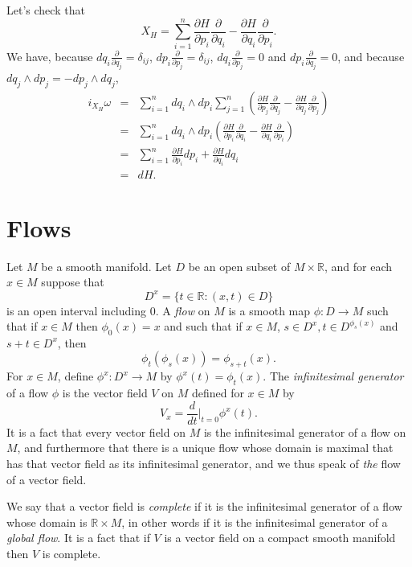 \documentclass{article}
\begin{document}
Let's check that 
\[
X_H = \sum_{i=1}^n \frac{\partial H}{\partial p_i} \frac{\partial}{\partial q_i}-\frac{\partial H}{\partial q_i}\frac{\partial}{\partial p_i}.
\]
We have, because $dq_i \frac{\partial}{\partial q_j}=\delta_{ij}$,  $dp_i \frac{\partial}{\partial p_j}=\delta_{ij}$, $dq_i \frac{\partial}{\partial p_j}=0$
and $dp_i \frac{\partial}{\partial q_j}=0$, and because $dq_j \wedge dp_j = - dp_j \wedge dq_j$,
\begin{eqnarray*}
i_{X_H} \omega&=&\sum_{i=1}^n dq_i \wedge dp_i  \sum_{j=1}^n \left( \frac{\partial H}{\partial p_j} \frac{\partial}{\partial q_j}-\frac{\partial H}{\partial q_j}\frac{\partial}{\partial p_j} \right)\\
&=&\sum_{i=1}^n dq_i \wedge dp_i \left(\frac{\partial H}{\partial p_i} \frac{\partial}{\partial q_i}-\frac{\partial H}{\partial q_i}\frac{\partial}{\partial p_i} \right)\\
&=&\sum_{i=1}^n \frac{\partial H}{\partial p_i} dp_i + \frac{\partial H}{\partial q_i} dq_i\\
&=&dH.
\end{eqnarray*}



\section{Flows}
Let $M$ be a smooth manifold. Let $D$ be an open subset of $M \times \mathbb{R}$, and for each $x \in M$ suppose that
\[
D^x = \{t \in \mathbb{R}: (x,t) \in D\}
\]
is an open interval including $0$. 
A {\em flow} on $M$ is a smooth map $\phi:D \to M$ such that if $x \in M$ then $\phi_0(x)=x$
and such that
if $x \in M$, $s \in D^x, t \in D^{\phi_s(x)}$ and $s+t \in D^x$, then
\[
\phi_t(\phi_s(x))=\phi_{s+t}(x).
\]
For $x \in M$, define $\phi^x:D^x \to M$ by $\phi^x(t)=\phi_t(x)$. 
The {\em infinitesimal generator} of a flow $\phi$ is the vector field $V$  on $M$ defined  for $x \in M$ by
\[
V_x=\frac{d}{dt}\Big|_{t=0} \phi^x(t).
\]
It is a fact that every vector field on $M$ is the infinitesimal generator of a flow on $M$, and furthermore that there is a unique flow whose domain is maximal
that has that vector field as its infinitesimal generator, and we thus speak of {\em the} flow of a vector field.

We say that a vector field is {\em complete} if it is the infinitesimal generator of a flow whose domain is $\mathbb{R} \times M$, in other words if it is the infinitesimal generator
of a {\em global flow}. It is a fact that if $V$ is a vector field on a compact smooth manifold then $V$ is complete.
\end{document}

